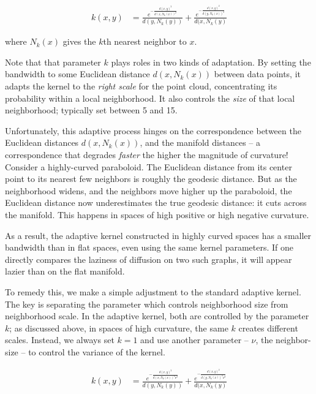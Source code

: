 \documentclass[
  letterpaper,
  DIV=11,
  numbers=noendperiod]{scrartcl}
\theoremstyle{plain}
\theoremstyle{plain}
\theoremstyle{definition}
\theoremstyle{plain}
\theoremstyle{definition}
\theoremstyle{plain}
\theoremstyle{remark}
\begin{document}
\[
\begin{aligned}
k(x, y) & =\frac{e^{-\frac{d(x, y)^2}{d(x, N_{k}(x))^2}}}{d(y, N_{k}(y))}
+\frac{e^{-\frac{d(x, y)^2}{d(y, N_{k}(x))^2}}}{d(x, N_{k}(y)}
\end{aligned}
\]

where \(N_{k}(x)\) gives the \(k\)th nearest neighbor to \(x\).

Note that that parameter \(k\) plays roles in two kinds of adaptation.
By setting the bandwidth to some Euclidean distance \(d(x,N_{k}(x))\)
between data points, it adapts the kernel to the \emph{right scale} for
the point cloud, concentrating its probability within a local
neighborhood. It also controls the \emph{size} of that local
neighborhood; typically set between 5 and 15.

Unfortunately, this adaptive process hinges on the correspondence
between the Euclidean distances \(d(x,N_{k}(x))\), and the manifold
distances -- a correspondence that degrades \emph{faster} the higher the
magnitude of curvature! Consider a highly-curved paraboloid. The
Euclidean distance from its center point to its nearest few neighbors is
roughly the geodesic distance. But as the neighborhood widens, and the
neighbors move higher up the paraboloid, the Euclidean distance now
underestimates the true geodesic distance: it cuts across the manifold.
This happens in spaces of high positive or high negative curvature.

As a result, the adaptive kernel constructed in highly curved spaces has
a smaller bandwidth than in flat spaces, even using the same kernel
parameters. If one directly compares the laziness of diffusion on two
such graphs, it will appear lazier than on the flat manifold.

To remedy this, we make a simple adjustment to the standard adaptive
kernel. The key is separating the parameter which controls neighborhood
size from neighborhood scale. In the adaptive kernel, both are
controlled by the parameter \(k\); as discussed above, in spaces of high
curvature, the same \(k\) creates different scales. Instead, we always
set \(k = 1\) and use another parameter -- \(\nu\), the neighbor-size --
to control the variance of the kernel.

\[
\begin{aligned}
k(x, y) & =\frac{e^{-\frac{d(x, y)^2}{d(x, N_{k}(x))^2\nu^2}}}{d(y, N_{k}(y))}
+\frac{e^{-\frac{d(x, y)^2}{d(y, N_{k}(x))^2\nu^2}}}{d(x, N_{k}(y)}
\end{aligned}
\]
\end{document}
